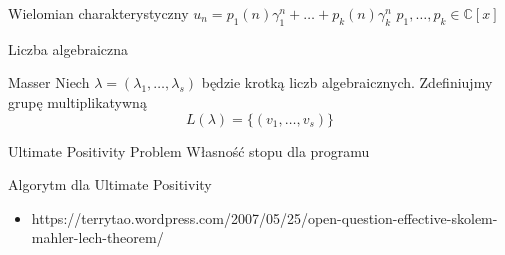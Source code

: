 \documentclass{beamer}
\theoremstyle{definition}
\begin{document}
\begin{frame}{Wielomian charakterystyczny}
    $u_{n}=p_{1}(n) \gamma_{1}^{n}+\ldots+p_{k}(n) \gamma_{k}^{n}$
    $p_{1}, \ldots, p_{k} \in \mathbb{C}[x]$
\end{frame}

\begin{frame}{Liczba algebraiczna}
    
\end{frame}

\begin{frame}{Masser }
    Niech $\lambda = (\lambda_1, \ldots, \lambda_s)$ będzie krotką liczb algebraicznych. 
    Zdefiniujmy grupę multiplikatywną 
    $$ L(\lambda) = \{(v_1, \ldots, v_s)\} $$
\end{frame}
    
\begin{frame}{Ultimate Positivity Problem}
    Własność stopu dla programu
    
\end{frame}





\begin{frame}{Algorytm dla Ultimate Positivity}
    
\end{frame}


\begin{frame}


\begin{itemize}
    \item https://terrytao.wordpress.com/2007/05/25/open-question-effective-skolem-mahler-lech-theorem/
\end{itemize}
\end{frame}
\end{document}
